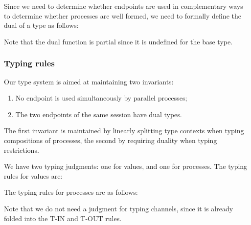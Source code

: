 Since we need to determine whether endpoints are used in complementary ways to determine whether processes are well formed, we need to formally define the dual of a type as follows:
Note that the dual function is partial since it is undefined for the base type.

\subsubsection{Typing rules}
Our type system is aimed at maintaining two invariants:
\begin{enumerate}
\item No endpoint is used simultaneously by parallel processes;
\item The two endpoints of the same session have dual types.
\end{enumerate}
The first invariant is maintained by linearly splitting type contexts when typing compositions of processes, the second by requiring duality when typing restrictions.

We have two typing judgments: one for values, and one for processes.
The typing rules for values are:
The typing rules for processes are as follows:
Note that we do not need a judgment for typing channels, since it is already folded into the T-IN and T-OUT rules.

